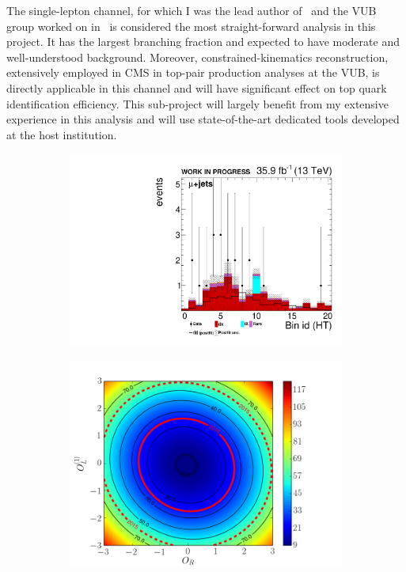 \textcolor{\mynew}{The single-lepton channel, for which I was the lead author of~\cite{Sirunyan:2017tep} and the VUB group worked on in~\cite{Khachatryan:2014sca} is considered the most straight-forward analysis in this project. It has the largest branching fraction and expected to have moderate and well-understood background. Moreover, constrained-kinematics reconstruction, extensively employed in CMS in top-pair production analyses at the VUB, is directly applicable in this channel and will have significant effect on top quark identification efficiency. This sub-project will largely benefit from my extensive experience in this analysis and will use state-of-the-art dedicated tools developed at the host institution.
\begin{figure}
\centering
\begin{subfigure}[t]{0.5\textwidth}
\includegraphics[width=0.8\linewidth]{figures/mu_ht_lin}\subcaption{}\label{fig:2a}
\end{subfigure}%
\begin{subfigure}[t]{0.5\textwidth}
\includegraphics[width=\linewidth]{figures/C1_C2}\subcaption{}\label{fig:2b}

\end{subfigure}
\end{figure}}

